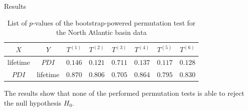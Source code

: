 \begin{block}{Results}
	\begin{table}[H]
		\centering
		\begin{tabular}{cccccccc}
		\toprule
		\toprule
		$X$  & $Y$       & $T^{(1)}$ & $T^{(2)}$ & $T^{(3)}$ & $T^{(4)}$ & $T^{(5)}$ & $T^{(6)}$ \\
		\midrule
		lifetime & $PDI$ & $0.146$   & $0.121$   & $0.711$   & $0.137$   & $0.117$   & $0.128$   \\
		$PDI$ & lifetime & $0.870$   & $0.806$   & $0.705$   & $0.864$   & $0.795$   & $0.830$   \\
		\bottomrule
		\end{tabular}
		\caption{List of $p$-values of the bootstrap-powered permutation test for the North Atlantic basin data}
		\label{tab:perm-natl-boot-p-vals}
	\end{table}


	\vspace*{0.08cm}
	The results show that none of the performed permutation tests is able to reject the null hypothesis $H_{0}$.
\end{block}

